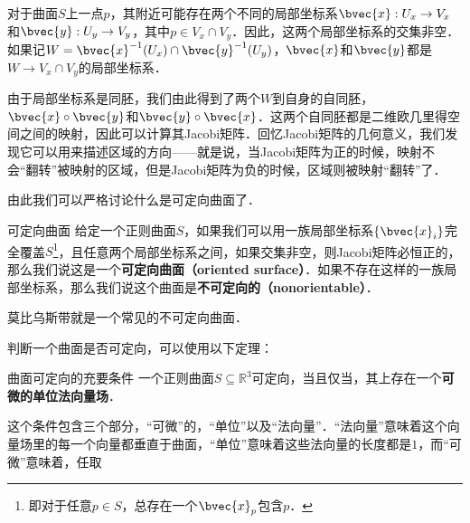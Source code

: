 
对于曲面$S$上一点$p$，其附近可能存在两个不同的局部坐标系$\bvec{x}:U_x\to V_x$和$\bvec{y}:U_y\to V_y$，其中$p\in V_x\cap V_y$．因此，这两个局部坐标系的交集非空．如果记$W=\bvec{x}^{-1}(U_x)\cap\bvec{y}^{-1}(U_y)$，$\bvec{x}$和$\bvec{y}$都是$W\to V_x\cap V_y$的局部坐标系．

由于局部坐标系是同胚，我们由此得到了两个$W$到自身的自同胚，$\bvec{x}\circ\bvec{y}$和$\bvec{y}\circ\bvec{x}$．这两个自同胚都是二维欧几里得空间之间的映射，因此可以计算其Jacobi矩阵．回忆Jacobi矩阵的几何意义，我们发现它可以用来描述区域的方向——就是说，当Jacobi矩阵为正的时候，映射不会“翻转”被映射的区域，但是Jacobi矩阵为负的时候，区域则被映射“翻转”了．

由此我们可以严格讨论什么是可定向曲面了．

\begin{definition}{可定向曲面}
给定一个正则曲面$S$，如果我们可以用一族局部坐标系$\{\bvec{x}_i\}$完全覆盖$S$\footnote{即对于任意$p\in S$，总存在一个$\bvec{x}_p$包含$p$．}，且任意两个局部坐标系之间，如果交集非空，则Jacobi矩阵必恒正的，那么我们说这是一个\textbf{可定向曲面（oriented surface）}．如果不存在这样的一族局部坐标系，那么我们说这个曲面是\textbf{不可定向的（nonorientable）}．
\end{definition}

莫比乌斯带就是一个常见的不可定向曲面．

判断一个曲面是否可定向，可以使用以下定理：

\begin{theorem}{曲面可定向的充要条件}
一个正则曲面$S\subseteq \mathbb{R}^3$可定向，当且仅当，其上存在一个\textbf{可微的单位法向量场}．
\end{theorem}

这个条件包含三个部分，“可微”的，“单位”以及“法向量”．“法向量”意味着这个向量场里的每一个向量都垂直于曲面，“单位”意味着这些法向量的长度都是$1$，而“可微”意味着，任取







